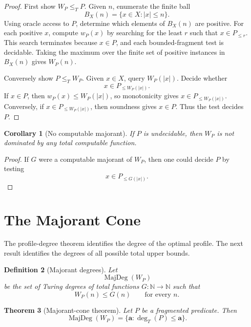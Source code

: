 \documentclass[11pt]{article}
\newtheorem{theorem}{Theorem}[section]
\newtheorem{corollary}[theorem]{Corollary}
\newtheorem{definition}[theorem]{Definition}
\begin{document}
\begin{proof}
First show \(W_P\le_T P\). Given \(n\), enumerate the finite ball
\[
B_X(n)=\{x\in X:|x|\le n\}.
\]
Using oracle access to \(P\), determine which elements of \(B_X(n)\) are positive. For each positive \(x\), compute \(w_P(x)\) by searching for the least \(r\) such that \(x\in P_{\le r}\). This search terminates because \(x\in P\), and each bounded-fragment test is decidable. Taking the maximum over the finite set of positive instances in \(B_X(n)\) gives \(W_P(n)\).

Conversely show \(P\le_T W_P\). Given \(x\in X\), query \(W_P(|x|)\). Decide whether
\[
x\in P_{\le W_P(|x|)}.
\]
If \(x\in P\), then \(w_P(x)\le W_P(|x|)\), so monotonicity gives \(x\in P_{\le W_P(|x|)}\). Conversely, if \(x\in P_{\le W_P(|x|)}\), then soundness gives \(x\in P\). Thus the test decides \(P\).
\end{proof}

\begin{corollary}[No computable majorant]
If \(P\) is undecidable, then \(W_P\) is not dominated by any total computable function.
\end{corollary}

\begin{proof}
If \(G\) were a computable majorant of \(W_P\), then one could decide \(P\) by testing
\[
x\in P_{\le G(|x|)}.
\]
\end{proof}

\section{The Majorant Cone}

The profile-degree theorem identifies the degree of the optimal profile. The next result identifies the degrees of all possible total upper bounds.

\begin{definition}[Majorant degrees]
Let
\[
\operatorname{MajDeg}(W_P)
\]
be the set of Turing degrees of total functions \(G:\mathbb N\to\mathbb N\) such that
\[
W_P(n)\le G(n)
\qquad
\text{for every }n.
\]
\end{definition}

\begin{theorem}[Majorant-cone theorem]
Let \(P\) be a fragmented predicate. Then
\[
\operatorname{MajDeg}(W_P)
=
\{\mathbf a:\deg_T(P)\le \mathbf a\}.
\]
\end{theorem}
\end{document}
